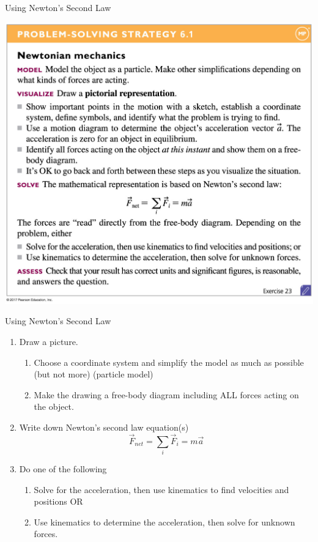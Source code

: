 \documentclass{beamer}
\begin{document}
\begin{frame}{Using Newton's Second Law}
\begin{center}
   \includegraphics[height=0.93\textheight]{../figures/06_ProblemSolvingStrat_01.jpg}
\end{center}
\end{frame}

\begin{frame}{Using Newton's Second Law}
\begin{enumerate}
   \item Draw a picture.
   \begin{enumerate}
      \item Choose a coordinate system and simplify the model as much as possible (but not more) (particle model)
      \item Make the drawing a free-body diagram including ALL forces acting on the object.
   \end{enumerate}
   \item Write down Newton's second law equation(s)
   \begin{equation*}
      \vec{F}_{net} = \sum\limits_i \vec{F}_i = m\vec{a}
   \end{equation*}
   \item Do one of the following
   \begin{enumerate}
      \item Solve for the acceleration, then use kinematics to find velocities and positions OR
      \item Use kinematics to determine the acceleration, then solve for unknown forces.
   \end{enumerate}
\end{enumerate}
\end{frame}
\end{document}
